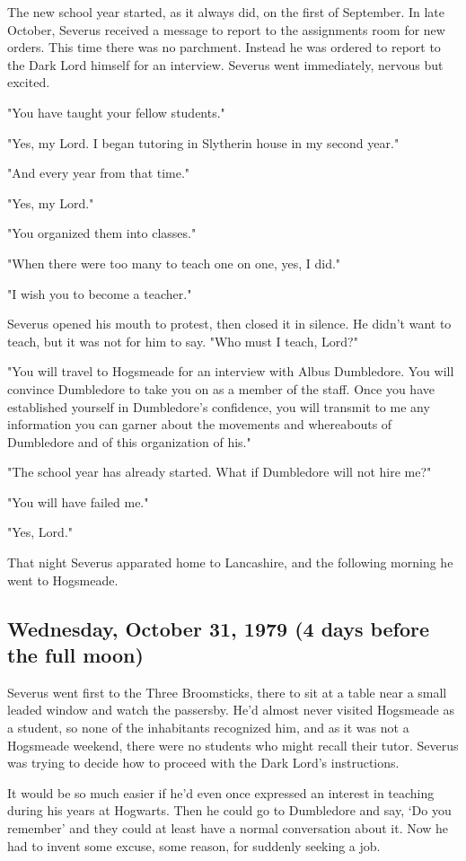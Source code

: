 The new school year started, as it always did, on the first of September. In late October, Severus received a message to report to the assignments room for new orders. This time there was no parchment. Instead he was ordered to report to the Dark Lord himself for an interview. Severus went immediately, nervous but excited.

"You have taught your fellow students."

"Yes, my Lord. I began tutoring in Slytherin house in my second year."

"And every year from that time."

"Yes, my Lord."

"You organized them into classes."

"When there were too many to teach one on one, yes, I did."

"I wish you to become a teacher."

Severus opened his mouth to protest, then closed it in silence. He didn't want to teach, but it was not for him to say. "Who must I teach, Lord?"

"You will travel to Hogsmeade for an interview with Albus Dumbledore. You will convince Dumbledore to take you on as a member of the staff. Once you have established yourself in Dumbledore's confidence, you will transmit to me any information you can garner about the movements and whereabouts of Dumbledore and of this organization of his."

"The school year has already started. What if Dumbledore will not hire me?"

"You will have failed me."

"Yes, Lord."

That night Severus apparated home to Lancashire, and the following morning he went to Hogsmeade.

\subsection{Wednesday, October 31, 1979 (4 days before the full moon)}

Severus went first to the Three Broomsticks, there to sit at a table near a small leaded window and watch the passersby. He'd almost never visited Hogsmeade as a student, so none of the inhabitants recognized him, and as it was not a Hogsmeade weekend, there were no students who might recall their tutor. Severus was trying to decide how to proceed with the Dark Lord's instructions.

It would be so much easier if he'd even once expressed an interest in teaching during his years at Hogwarts. Then he could go to Dumbledore and say, `Do you remember{\el}' and they could at least have a normal conversation about it. Now he had to invent some excuse, some reason, for suddenly seeking a job.

